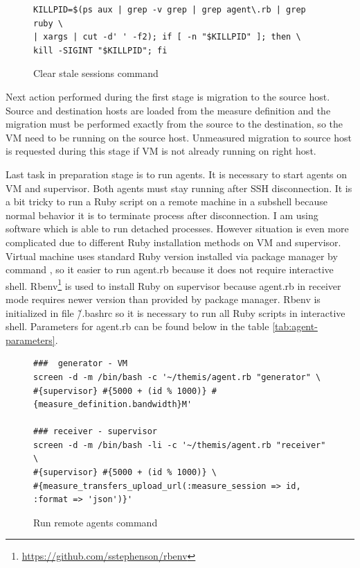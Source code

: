 \begin{figure}[htb]
\caption{Clear stale sessions command}
\label{cmd:killcmd}
\begin{verbatim}
KILLPID=$(ps aux | grep -v grep | grep agent\.rb | grep ruby \
| xargs | cut -d' ' -f2); if [ -n "$KILLPID" ]; then \
kill -SIGINT "$KILLPID"; fi 
\end{verbatim}
\end{figure}

Next action performed during the first stage is migration to the source host. Source and destination hosts are loaded from the measure definition and the migration must be performed exactly from the source to the destination, so the \Ac{VM} need to be running on the source host. Unmeasured migration to source host is requested during this stage if \Ac{VM} is not already running on right host.

Last task in preparation stage is to run agents. It is necessary to start agents on \Ac{VM} and supervisor. Both agents must stay running after \Ac{SSH} disconnection. It is a bit tricky to run a Ruby script on a remote machine in a subshell because normal behavior it is to terminate process after disconnection. I am using \Cmd{screen} software which is able to run detached processes. However situation is even more complicated due to different Ruby installation methods on \Ac{VM} and supervisor. Virtual machine uses standard Ruby version installed via package manager by command , so it easier to run agent.rb because it does not require interactive shell. Rbenv\footnote{\url{https://github.com/sstephenson/rbenv}} is used to install Ruby on supervisor because agent.rb in receiver mode requires newer version than provided by package manager. Rbenv is initialized in file \~/.bashrc so it is necessary to run all Ruby scripts in interactive shell. Parameters for agent.rb can be found below in the table \ref{tab:agent-parameters}.

\begin{figure}[htb]
\caption{Run remote agents command}
\label{cmd:remote agents}
\begin{verbatim}
###  generator - VM
screen -d -m /bin/bash -c '~/themis/agent.rb "generator" \
#{supervisor} #{5000 + (id % 1000)} #{measure_definition.bandwidth}M'

### receiver - supervisor
screen -d -m /bin/bash -li -c '~/themis/agent.rb "receiver" \
#{supervisor} #{5000 + (id % 1000)} \
#{measure_transfers_upload_url(:measure_session => id, :format => 'json')}'
\end{verbatim}
\end{figure}

